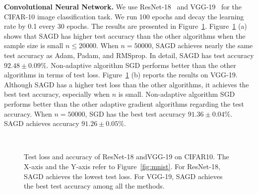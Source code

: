 \documentclass[11pt]{article}
\begin{document}
\vspace{-0.05in}
\textbf{Convolutional Neural Network.}
We use ResNet-18~\citep{hezh2016} and VGG-19~\citep{sizi2014} for the CIFAR-10 image classification task. We run 100 epochs and decay the learning rate by 0.1 every 30 epochs. 
The results are presented in Figure~\ref{fig:cifar10}. Figure~\ref{fig:cifar10} (a) shows that \textsc{SAGD} has higher test accuracy than the 
other algorithms when the sample size is small \ie $n \leq 20000$.
When $n = 50000$, \textsc{SAGD} achieves nearly the same test accuracy as Adam, Padam, and RMSprop. In detail, \textsc{SAGD} has test accuracy $92.48 \pm 0.09\%$.
Non-adaptive algorithm 
SGD performs better than the other algorithms in terms of test loss. 
Figure~\ref{fig:cifar10} (b) reports the results on VGG-19. Although \textsc{SAGD} has a higher test loss than the other algorithms, it achieves the best test accuracy, especially when $n$ is small. Non-adaptive algorithm SGD performs better than the other adaptive gradient algorithms regarding the test accuracy.
When $n= 50000$, SGD has the best test accuracy $91.36 \pm 0.04\%$. \textsc{SAGD} achieves accuracy $91.26 \pm 0.05\%$.
\begin{figure}[H]
\mbox{
\hspace{-0.1in}
 }
 \caption[]{Test loss and accuracy of ResNet-18 andVGG-19 on CIFAR10. The X-axis and the
Y-axis refer to Figure~\ref{fig:mnist}. For ResNet-18, \textsc{SAGD} achieves the lowest test loss. For VGG-19, \textsc{SAGD} achieves the best test accuracy among all the methods. } 
 \label{fig:cifar10}
\end{figure}
\end{document}
